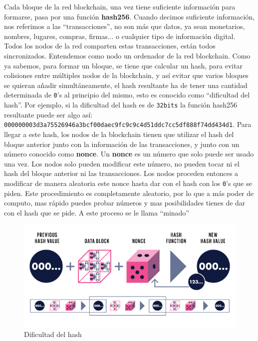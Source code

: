 Cada bloque de la red blockchain, una vez tiene suficiente información para formarse, pasa por una función \textbf{hash256}. Cuando decimos suficiente información, nos referimos a las ``transacciones'', no son más que datos, ya sean monetarios, nombres, lugares, compras, firmas... o cualquier tipo de información digital. Todos los nodos de la red comparten estas transacciones, están todos sincronizados. Entendemos como nodo un ordenador de la red blockchain. Como ya sabemos, para formar un bloque, se tiene que calcular un hash, para evitar colisiones entre múltiples nodos de la blockchain, y así evitar que varios bloques se quieran añadir simultáneamente, el hash resultante ha de tener una cantidad determinada de \verb|0|'s al principio del mismo, esto es conocido como ``dificultad del hash''. Por ejemplo, si la dificultad del hash es de \verb|32bits| la función hash256 resultante puede ser algo así: \verb|000000003d3a75526946a3bcf00daec9fc9c9c4d51ddc7cc5df888f74dd434d1|. Para llegar a este hash, los nodos de la blockchain tienen que utilizar el hash del bloque anterior junto con la información de las transacciones, y junto con un número conocido como \textbf{nonce}\cite{whatIsNonce}. Un \textbf{nonce} es un número que solo puede ser usado una vez. Los nodos solo pueden modificar este número, no pueden tocar ni el hash del bloque anterior ni las transacciones. Los nodos proceden entonces a modificar de manera aleatoria este nonce hasta dar con el hash con los \verb|0|'s que se piden. Este procedimiento es completamente aleatorio, por lo que a más poder de computo, mas rápido puedes probar números y mas posibilidades tienes de dar con el hash que se pide. A este proceso se le llama ``minado''\cite{minarBitcoin}

\begin{figure}[h!]
  \centering
  \includegraphics[width=0.8\linewidth]{figs/EstadoArte/Blockchain/hashDificultad}
  \caption[Hash dificultad]{Dificultad del hash}
  \label{fig:hashDiff}
\end{figure}

